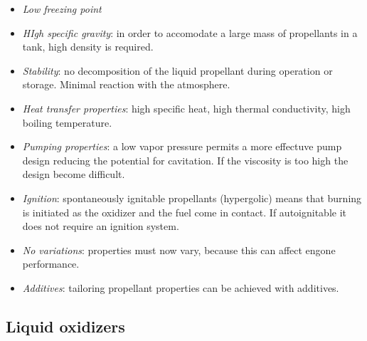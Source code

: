 \documentclass[12pt]{article}
\begin{document}
\begin{itemize}
    \item \textit{Low freezing point}
    \item \textit{HIgh specific gravity}: in order to accomodate a large mass of propellants in a tank, high density is required.
    \item \textit{Stability}: no decomposition of the liquid propellant during operation or storage. Minimal reaction with the atmosphere.
    \item \textit{Heat transfer properties}: high specific heat, high thermal conductivity, high boiling temperature.
    \item \textit{Pumping properties}: a low vapor pressure permits a more effectuve pump design reducing the potential for cavitation. If the viscosity is too high the design become difficult.
    \item \textit{Ignition}: spontaneously ignitable propellants (hypergolic) means that burning is initiated as the oxidizer and the fuel come in contact. If autoignitable it does not require an ignition system.
    \item \textit{No variations}: properties must now vary, because this can affect engone performance.
    \item \textit{Additives}: tailoring propellant properties can be achieved with additives.
\end{itemize}

\subsection{Liquid oxidizers}
\end{document}
